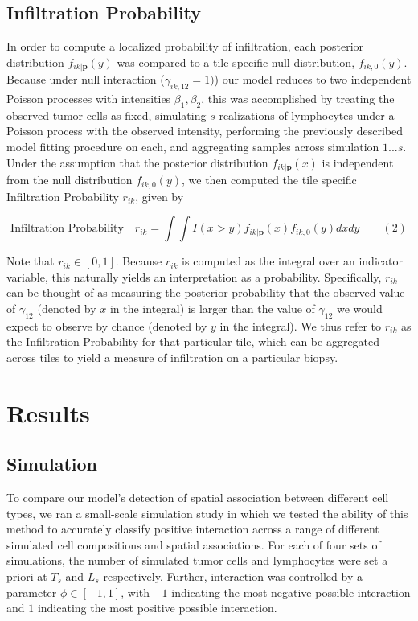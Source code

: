 \documentclass[
]{book}
\begin{document}
\hypertarget{infiltration-probability}{%
\section{Infiltration Probability}\label{infiltration-probability}}

In order to compute a localized probability of infiltration, each
posterior distribution \(f_{ik | \mathbf{p}}(y)\) was compared to a
tile specific null distribution, \(f_{ik, 0}(y)\).
Because under null interaction (\(\gamma_{ik, 12} = 1)\)) our
model reduces to two independent Poisson processes with
intensities \(\beta_1, \beta_2\), this was accomplished by
treating the observed tumor cells as fixed, simulating \(s\)
realizations of lymphocytes under a Poisson process with the
observed intensity, performing the previously described model
fitting procedure on each, and aggregating samples across
simulation \(1...s\). Under the assumption that the posterior
distribution \(f_{ik | \mathbf{p}}(x)\) is independent from the null
distribution \(f_{ik, 0}(y)\), we then computed the tile specific
Infiltration Probability \(r_{ik}\), given by

\[\text{Infiltration Probability} \quad r_{ik} = \int \int  I(x > y) f_{ik | \mathbf{p}}(x) f_{ik, 0}(y)  dxdy \qquad (2)\]

Note that \(r_{ik} \in [0, 1]\). Because \(r_{ik}\) is computed as
the integral over an indicator variable, this naturally yields
an interpretation as a probability. Specifically, \(r_{ik}\) can
be thought of as measuring the posterior probability that the
observed value of \(\gamma_{12}\) (denoted by \(x\) in the
integral) is larger than the value of \(\gamma_{12}\) we would
expect to observe by chance (denoted by \(y\) in the integral).
We thus refer to \(r_{ik}\) as the Infiltration Probability
for that particular tile, which can be aggregated across tiles
to yield a measure of infiltration on a particular biopsy.

\hypertarget{results}{%
\chapter{Results}\label{results}}

\hypertarget{simulation}{%
\section{Simulation}\label{simulation}}

To compare our model's detection of spatial association between
different cell types, we ran a small-scale simulation study in
which we tested the ability of this method to accurately classify
positive interaction across a range of different simulated cell
compositions and spatial associations. For each of four sets of
simulations, the number of simulated tumor cells and lymphocytes
were set a priori at \(T_s\) and \(L_s\) respectively. Further,
interaction was controlled by a parameter \(\phi \in [-1, 1]\), with
\(-1\) indicating the most negative possible interaction and \(1\)
indicating the most positive possible interaction.
\end{document}
